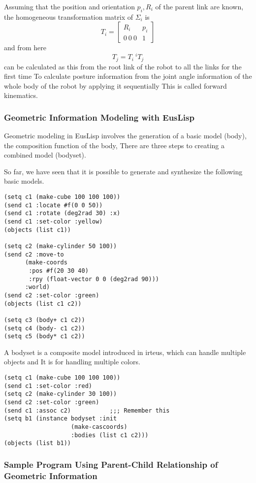 Assuming that the position and orientation $p_i, R_i$ of the parent link are known, the homogeneous transformation matrix of $\Sigma_i$ is
\[
  T_i =
  \left[
  \begin{array}{cc}
   R_i & p_i \\
   0~0~0 & 1
  \end{array}
  \right]
\]
and from here
\[
  T_j = T_i ~ {}^iT_j
\]
can be calculated as this from the root link of the robot to all the links for the first time
To calculate posture information from the joint angle information of the whole body of the robot by applying it sequentially
This is called forward kinematics.

\subsubsection{Geometric Information Modeling with EusLisp}

Geometric modeling in EusLisp involves the generation of a basic model (body), the composition function of the body,
There are three steps to creating a combined model (bodyset).

So far, we have seen that it is possible to generate and synthesize the following basic models.
{\baselineskip=10pt
\begin{verbatim}
(setq c1 (make-cube 100 100 100))
(send c1 :locate #f(0 0 50))
(send c1 :rotate (deg2rad 30) :x)
(send c1 :set-color :yellow)
(objects (list c1))

(setq c2 (make-cylinder 50 100))
(send c2 :move-to
      (make-coords
       :pos #f(20 30 40)
       :rpy (float-vector 0 0 (deg2rad 90)))
      :world)
(send c2 :set-color :green)
(objects (list c1 c2))

(setq c3 (body+ c1 c2))
(setq c4 (body- c1 c2))
(setq c5 (body* c1 c2))
\end{verbatim}
}

A bodyset is a composite model introduced in irteus, which can handle multiple objects and
It is for handling multiple colors.

{\baselineskip=10pt
\begin{verbatim}
(setq c1 (make-cube 100 100 100))
(send c1 :set-color :red)
(setq c2 (make-cylinder 30 100))
(send c2 :set-color :green)
(send c1 :assoc c2)           ;;; Remember this
(setq b1 (instance bodyset :init
                   (make-cascoords)
                   :bodies (list c1 c2)))
(objects (list b1))
\end{verbatim}
}

\subsubsection{Sample Program Using Parent-Child Relationship of Geometric Information}

